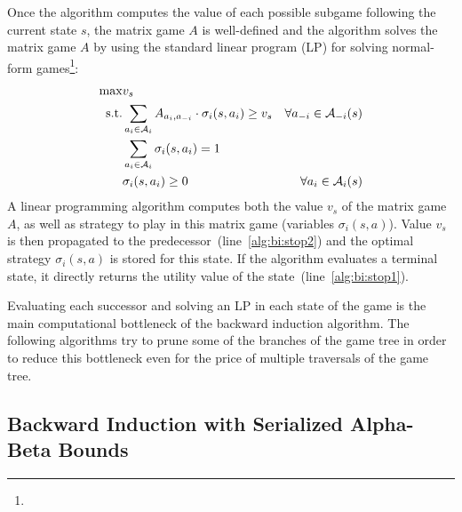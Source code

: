 Once the algorithm computes the value of each possible subgame following the current state $s$, the matrix game $A$ is well-defined and the algorithm
solves the matrix game $A$ by using the standard linear program (LP) for solving normal-form games\footnote{}:
\begin{eqnarray}
\max & v_s & \\
\textrm{s.t.} & \sum_{a_i \in \mathcal{A}_{i}}A_{a_i,a_{-i}} \cdot \sigma_i(s,a_i) \geq v_s & \forall a_{-i} \in \mathcal{A}_{-i}(s)\\
& \sum_{a_{i} \in \mathcal{A}_{i}} \sigma_i(s,a_{i}) = 1 \\
& \sigma_i(s,a_{i}) \geq 0 & \forall a_{i} \in \mathcal{A}_{i}(s)
\end{eqnarray}
A linear programming algorithm computes both the value $v_s$ of the matrix game $A$, as well as strategy to play in this matrix game (variables $\sigma_i(s,a)$).
Value $v_s$ is then propagated to the predecessor~(line~\ref{alg:bi:stop2}) and the optimal strategy $\sigma_i(s,a)$ is stored for this state.
If the algorithm evaluates a terminal state, it directly returns the utility value of the state~(line~\ref{alg:bi:stop1}).

Evaluating each successor and solving an LP in each state of the game is the main computational bottleneck of the backward induction algorithm.
The following algorithms try to prune some of the branches of the game tree in order to reduce this bottleneck even for the price of multiple traversals of the game tree.

\subsection{Backward Induction with Serialized Alpha-Beta Bounds}\label{sec:algs:biab}

